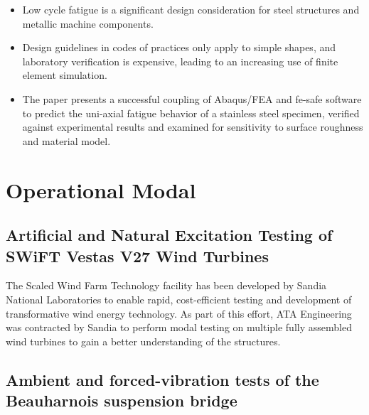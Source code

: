\documentclass[
  letterpaper,
  DIV=11,
  numbers=noendperiod]{scrreprt}
\providecommand{\tightlist}{%
  \setlength{\itemsep}{0pt}\setlength{\parskip}{0pt}}\usepackage{longtable,booktabs,array}
\begin{document}
\begin{itemize}
\tightlist
\item
  Low cycle fatigue is a significant design consideration for steel
  structures and metallic machine components.
\item
  Design guidelines in codes of practices only apply to simple shapes,
  and laboratory verification is expensive, leading to an increasing use
  of finite element simulation.
\item
  The paper presents a successful coupling of Abaqus/FEA and fe-safe
  software to predict the uni-axial fatigue behavior of a stainless
  steel specimen, verified against experimental results and examined for
  sensitivity to surface roughness and material model.
\end{itemize}

\hypertarget{operational-modal}{%
\section{Operational Modal}\label{operational-modal}}

\hypertarget{artificial-and-natural-excitation-testing-of-swift-vestas-v27-wind-turbines}{%
\subsection{Artificial and Natural Excitation Testing of SWiFT Vestas
V27 Wind
Turbines}\label{artificial-and-natural-excitation-testing-of-swift-vestas-v27-wind-turbines}}

The Scaled Wind Farm Technology facility has been developed by Sandia
National Laboratories to enable rapid, cost-efficient testing and
development of transformative wind energy technology. As part of this
effort, ATA Engineering was contracted by Sandia to perform modal
testing on multiple fully assembled wind turbines to gain a better
understanding of the structures.

\hypertarget{ambient-and-forced-vibration-tests-of-the-beauharnois-suspension-bridge}{%
\subsection{Ambient and forced-vibration tests of the Beauharnois
suspension
bridge}\label{ambient-and-forced-vibration-tests-of-the-beauharnois-suspension-bridge}}
\end{document}
